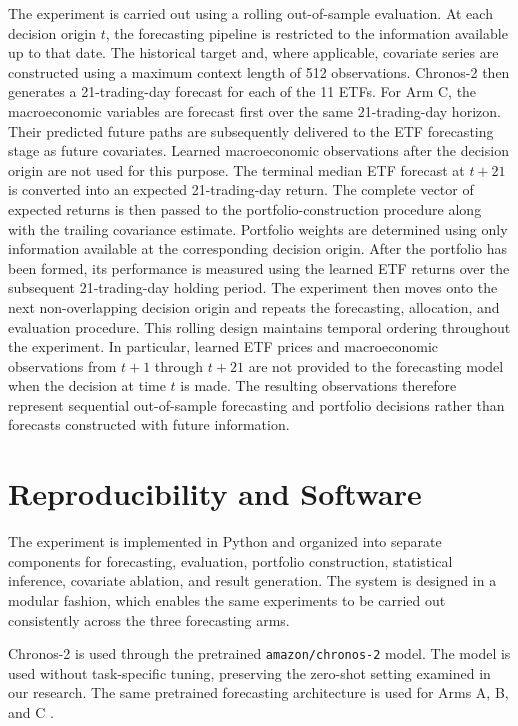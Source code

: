 \documentclass[12pt,a4paper,twoside,openany]{book}
\begin{document}
The experiment is carried out using a rolling out-of-sample evaluation.
At each decision origin \(t\), the forecasting pipeline is restricted
to the information available up to that date. The historical target and,
where applicable, covariate series are constructed using a maximum
context length of 512 observations.
Chronos-2 then generates a 21-trading-day forecast for each of the
11 ETFs. For Arm C, the macroeconomic variables are forecast
first over the same 21-trading-day horizon. Their predicted future
paths are subsequently delivered to the ETF forecasting stage as
future covariates. Learned macroeconomic observations after the
decision origin are not used for this purpose.
The terminal median ETF forecast at \(t+21\) is converted into an
expected 21-trading-day return. The complete vector of expected
returns is then passed to the portfolio-construction procedure
along with the trailing covariance estimate. Portfolio weights
are determined using only information available at the corresponding
decision origin.
After the portfolio has been formed, its performance is measured
using the learned ETF returns over the subsequent 21-trading-day
holding period. The experiment then moves  onto the next
non-overlapping decision origin and repeats the forecasting,
allocation, and evaluation procedure.
This rolling design maintains temporal ordering throughout the
experiment. In particular, learned ETF prices and macroeconomic
observations from \(t+1\) through \(t+21\) are not provided to the
forecasting model when the decision at time \(t\) is made. The
resulting observations therefore represent sequential out-of-sample
forecasting and portfolio decisions rather than forecasts constructed
with future information.

\section{Reproducibility and
Software}\label{reproducibility-and-software}

The experiment is implemented in Python and organized into
separate components for forecasting, evaluation, portfolio
construction, statistical inference, covariate ablation, and result
generation. The system is designed in a modular fashion, which enables the same experiments to be carried out consistently across the three forecasting arms.

Chronos-2 is used through the pretrained
\texttt{amazon/chronos-2} model. The model is used without
task-specific tuning, preserving the zero-shot setting examined
in our research. The same pretrained forecasting architecture is used
for Arms A, B, and C \cite{ansari2025chronos2}.
\end{document}
